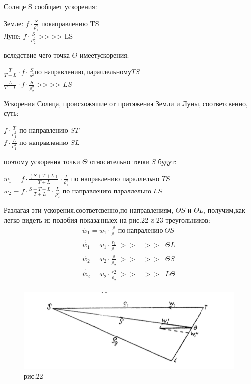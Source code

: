 \documentclass[a4paper,12pt]{article}
\begin{document}
Солнце S сообщает ускорения:
\begin{center}
    Земле: \; $f\cdot \frac{S}{\rho_{1}^2}$ \;по\;направлению\; TS \\
    Луне: \; $f\cdot \frac{S}{\rho_{2}^2}$ \; >> \;\;\; >> \;\;\;LS\\
\end{center}
вследствие чего точка $\Theta$ \:имеет\:ускорения:

\begin{center}
    $\frac{T}{T+L} \cdot f \cdot \frac{S}{\rho_{1}^2}$\;по\; направлению,\,параллельному\;$TS$\\
    $\frac{L}{T+L} \cdot f \cdot \frac{S}{\rho_{2}^2}$ \: >> \;\;\; >> \;\; $LS$ \\
\end{center}

Ускорения Солнца, происхожящие от притяжения Земли и Луны, соответсвенно, суть:
\begin{center}
    $f \cdot \frac{T}{\rho_{1}^2}$ по направлению $ST$\\
    $f \cdot \frac{L}{\rho_{1}^2}$ по направлению $SL$\\
\end{center}
поэтому ускорения точки $\Theta$ относительно точки $S$ будут:
\begin{center}
    $w_1 = f\cdot \frac{\left(S+T+L\right)}{T+L} \cdot \frac{T}{\rho_{1}^2}$ по направлению параллельно $TS$ \\
    $w_2 = f\cdot \frac{S+T+L}{T+L} \cdot \frac{L}{\rho_{2}^2}$ по направлению параллельно $LS$ \\
\end{center}
Разлагая эти ускорения,соответсвенно,по направлениям, $\Theta S$ и $\Theta L$, получим,как легко видеть из подобия показанныех на рис.22 и 23 треугольников:
\begin{equation*}
    \begin{aligned}
        \acute{w_1} = w_1 \cdot \frac{\rho}{\rho_1} \:по\:напралению\: \Theta S \\
        \acute{\acute{w_1}} = w_1 \cdot \frac{r_1}{\rho_1} \;>>\;\;\; >>\;\; \Theta L \\
        \acute{w_2} = w_2 \cdot \frac{\rho}{\rho_2} \;>>\;\;\; >>\;\; \Theta S \\
        \acute{\acute{w_2}} = w_2 \cdot \frac{r2}{\rho_2} \;>>\;\;\; >>\;\; L\Theta  \\
    \end{aligned}
\end{equation*}
\begin{figure}[bhtp]
    \centering
    \includegraphics{22.png}
    \caption{рис.22}
    \label{fig:22}
\end{figure}
\end{document}
